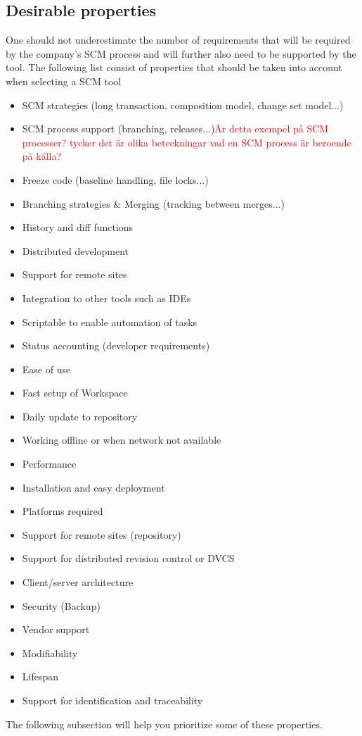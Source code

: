\documentclass[10pt]{article}
\newcommand\remove[1]{\textcolor{red}{#1}}
\begin{document}
\subsection{Desirable properties}
One should not underestimate the number of requirements that will be required by the company's SCM process and will further also need to be supported by the tool. The following list consist of properties that should be taken into account when selecting a SCM tool
\begin{itemize}
\item SCM strategies (long transaction, composition model, change set model...)
\item SCM process support (branching, releases...)\remove{Är detta exempel på SCM processer? tycker det är olika beteckningar vad en SCM process är beroende på källa?}
\item Freeze code (baseline handling, file locks...)
\item Branching strategies \& Merging (tracking between merges...)
\item History and diff functions
\item Distributed development
\item Support for remote sites
\item Integration to other tools such as IDEs
\item Scriptable to enable automation of tasks
\item Status accounting (developer requirements)
\item Ease of use
\item Fast setup of Workspace
\item Daily update to repository
\item Working offline or when network not available
\item Performance
\item Installation and easy deployment
\item Platforms required
\item Support for remote sites (repository)
\item Support for distributed revision control or DVCS
\item Client/server architecture
\item Security (Backup)
\item Vendor support
\item Modifiability
\item Lifespan
\item Support for identification and traceability
\end{itemize}
The following subsection will help you prioritize some of these properties.
\end{document}

